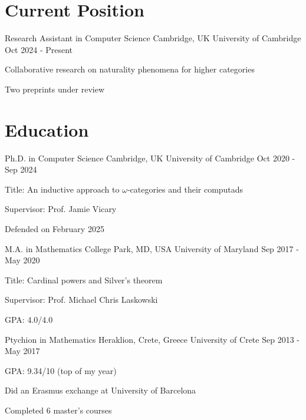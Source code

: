 \documentclass{academic-cv}
\begin{document}
\makecvheader

\section*{Current Position}
    \begin{cvlist}
        \cvheading
            {Research Assistant in Computer Science}
            {Cambridge, UK}
            {University of Cambridge}
            {Oct 2024 - Present}
            {\begin{cvlist}
                \item Collaborative research on naturality phenomena for higher categories
                \item Two preprints under review
            \end{cvlist}}
    \end{cvlist}

\section*{Education}
    \begin{cvlist}
        \cvheading
            {Ph.D. in Computer Science}
            {Cambridge, UK}
            {University of Cambridge}
            {Oct 2020 - Sep 2024}
            {\begin{cvlist}
                \item Title: An inductive approach to \(\omega\)‑categories and their computads
                \item Supervisor: Prof. Jamie Vicary
                \item Defended on February 2025
            \end{cvlist}}
        \cvheading
            {M.A. in Mathematics}
            {College Park, MD, USA}
            {University of Maryland}
            {Sep 2017 - May 2020}
            {\begin{cvlist}
                \item Title: Cardinal powers and Silver’s theorem
                \item Supervisor: Prof. Michael Chris Laskowski
                \item GPA: 4.0/4.0
            \end{cvlist}}
        \cvheading
            {Ptychion in Mathematics}
            {Heraklion, Crete, Greece}
            {University of Crete}
            {Sep 2013 - May 2017}
            {\begin{cvlist}
                \item GPA: 9.34/10 (top of my year)
                \item Did an Erasmus exchange at University of Barcelona
                \item Completed 6 master's courses
            \end{cvlist}}
    \end{cvlist}
\end{document}
